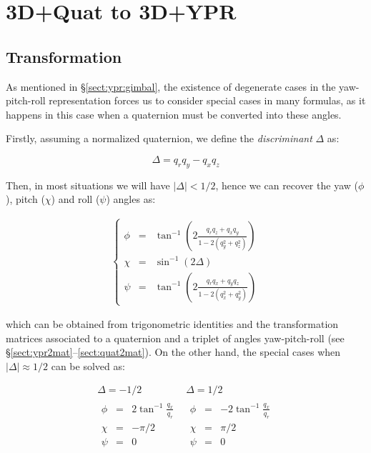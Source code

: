 \documentclass[a4paper,11pt]{report}
\begin{document}
\section{3D+Quat to 3D+YPR  }

\subsection{Transformation}

As mentioned in \S \ref{sect:ypr:gimbal}, the existence of degenerate cases in 
the yaw-pitch-roll representation forces us to consider special cases in many formulas, 
as it happens in this case when a quaternion must be converted into these angles.

Firstly, assuming a normalized quaternion, we define the \emph{discriminant} $\Delta$ as:

\begin{equation}
 \Delta = q_r q_y - q_x q_z
\end{equation}

Then, in most situations we will have $|\Delta|<1/2$, hence we can recover the
yaw ($\phi$),
pitch ($\chi$) and roll ($\psi$) angles as:

\begin{eqnarray}
\left\{
\begin{array}{rcl}
 \phi &=& \tan^{-1} \left( 2 \frac{q_r q_z + q_x q_y}{1-2(q_y^2+q_z^2)}  \right) \nonumber \\
 \chi &=& \sin^{-1} \left( 2 \Delta \right) \label{eq:quat2ypr_1} \\
 \psi &=& \tan^{-1} \left( 2 \frac{q_r q_x + q_y q_z}{1-2(q_x^2+q_y^2)}  \right) \nonumber
\end{array}
\right.
\end{eqnarray}

\noindent which can be obtained from trigonometric identities and 
the transformation matrices associated to a quaternion and a triplet of angles yaw-pitch-roll 
(see \S \ref{sect:ypr2mat}--\ref{sect:quat2mat}).
On the other hand, the special cases when $|\Delta| \approx 1/2$ can be solved as:

\begin{equation}
\begin{array}{c|c}
  \Delta = -1/2 & \Delta = 1/2 \\ \hline
  \begin{array}{rcl}
    \phi &=& 2 \tan^{-1} \frac{q_x}{q_r} \\
    \chi &=& -\pi /2 \\
    \psi &=& 0
  \end{array} 
&
  \begin{array}{rcl}
    \phi &=& -2 \tan^{-1} \frac{q_x}{q_r} \\
    \chi &=& \pi /2 \\
    \psi &=& 0
  \end{array} 
\end{array}
\label{eq:quat2ypr_2}
\end{equation}
\end{document}

